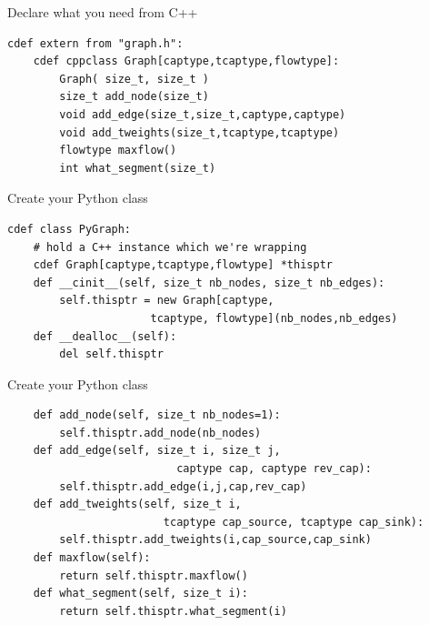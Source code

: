 \documentclass[12pt]{beamer}
\begin{document}
\begin{frame}[fragile]{Declare what you need from C++}

\begin{verbatim}
cdef extern from "graph.h":
    cdef cppclass Graph[captype,tcaptype,flowtype]:
        Graph( size_t, size_t ) 
        size_t add_node(size_t)
        void add_edge(size_t,size_t,captype,captype)
        void add_tweights(size_t,tcaptype,tcaptype)
        flowtype maxflow()
        int what_segment(size_t)
\end{verbatim}
\end{frame}

\begin{frame}[fragile]{Create your Python class}
\footnotesize
\begin{verbatim}
cdef class PyGraph:
    # hold a C++ instance which we're wrapping
    cdef Graph[captype,tcaptype,flowtype] *thisptr    
    def __cinit__(self, size_t nb_nodes, size_t nb_edges):
        self.thisptr = new Graph[captype, 
                      tcaptype, flowtype](nb_nodes,nb_edges)
    def __dealloc__(self):
        del self.thisptr
\end{verbatim}
\end{frame}

\begin{frame}[fragile]{Create your Python class}
\footnotesize
\begin{verbatim}
    def add_node(self, size_t nb_nodes=1):
        self.thisptr.add_node(nb_nodes)
    def add_edge(self, size_t i, size_t j, 
                          captype cap, captype rev_cap):
        self.thisptr.add_edge(i,j,cap,rev_cap)
    def add_tweights(self, size_t i, 
                        tcaptype cap_source, tcaptype cap_sink):
        self.thisptr.add_tweights(i,cap_source,cap_sink)
    def maxflow(self):
        return self.thisptr.maxflow()
    def what_segment(self, size_t i):
        return self.thisptr.what_segment(i)
\end{verbatim}
\end{frame}
\end{document}
